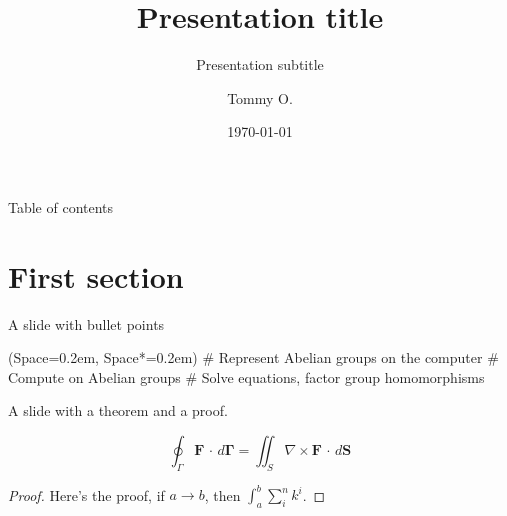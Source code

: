 \documentclass[12pt, aspectratio=149]{beamer}
\title{Presentation title}
\subtitle{Presentation subtitle}
\institute{Some institute}
\date{\today}
\author{Tommy O.}
\newcommand{\listSpace}{0.2em}
\theoremstyle{plain}
\begin{document}
\maketitle
  
\begin{frame}{Table of contents}
	\tableofcontents
\end{frame}

\section{First section}
\begin{frame}[fragile, t]{A slide with bullet points}
	\begin{easylist}[itemize]
		\ListProperties(Space=\listSpace, Space*=\listSpace)
		# Represent Abelian groups on the computer
		# Compute on Abelian groups
		# Solve equations, factor group homomorphisms
	\end{easylist}
\end{frame}

\begin{frame}[fragile, t]{A slide with a theorem and a proof.}
\begin{theorem}[Integral]
	\begin{equation*}
		\oint_\Gamma \mathbf{F}\, \cdot\, d{\mathbf{\Gamma}}  = \iint_S \nabla\times\mathbf{F}\, \cdot\, d\mathbf{S} 
	\end{equation*}
\end{theorem}
\begin{proof}
Here's the proof, if $a \to b$, then $\int_{a}^{b} \sum_i^n k^i$.
\end{proof}
\end{frame}
\end{document}
